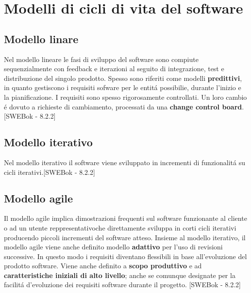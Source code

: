 \chapter{Modelli di cicli di vita del software}

\section{Modello linare}
Nel modello lineare le fasi di sviluppo del software sono compiute sequenzialmente con feedback e iterazioni al seguito di integrazione, test e distribuzione del singolo prodotto.
Spesso sono riferiti come modelli \textbf{predittivi}, in quanto gestiscono i requisiti sofware per le entit\'a possibilie, durante l'inizio e la pianificazione.
I requisiti sono spesso rigorosamente controllati. Un loro cambio \'e dovuto a richieste di cambiamento, processati da una \textbf{change control board}. [SWEBok - 8.2.2]

\section{Modello iterativo}
Nel modello iterativo il software viene sviluppato in incrementi di funzionalit\'a su cicli iterativi.[SWEBok - 8.2.2]

\section{Modello agile}
Il modello agile implica dimostrazioni frequenti sul software funzionante al cliente o ad un utente reppresentativoche direttamente sviluppa in corti cicli iterativi producendo piccoli incrementi del software atteso.
Insieme al modello iterativo, il modello agile viene anche definito modello \textbf{adattivo} per l'uso di revisioni successive. In questo modo i requisiti diventano flessibili in base all'evoluzione del prodotto software.
Viene anche definito a \textbf{scopo produttivo} e ad \textbf{caratteristiche iniziali di alto livello}; anche se comunque designate per la facilit\'a d'evoluzione dei requisiti software durante il progetto. [SWEBok - 8.2.2]
